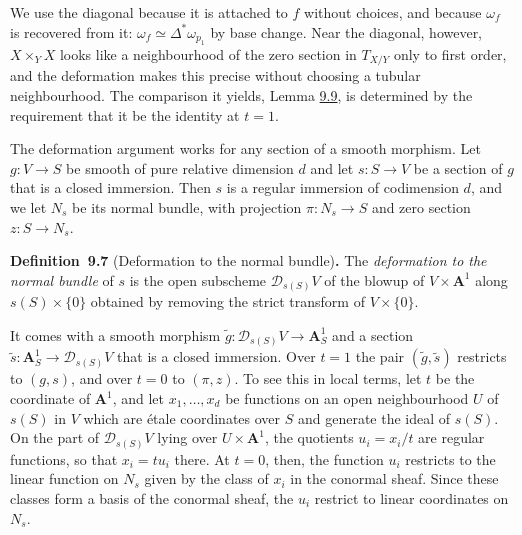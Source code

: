 \documentclass[11pt]{article}
\newenvironment{bpstatement}[2]{\par\addvspace{0.6\baselineskip}\noindent\textbf{#1}#2\textbf{.}\enspace\ignorespaces}
  {\par\addvspace{0.4\baselineskip}}
\begin{document}
We use the diagonal because it is attached to \(f\) without choices, and because \(\omega_f\) is recovered from it: \(\omega_f\simeq\Delta^*\omega_{p_1}\) by base change. Near the diagonal, however, \(X\times_YX\) looks like a neighbourhood of the zero section in \(T_{X/Y}\) only to first order, and the deformation makes this precise without choosing a tubular neighbourhood. The comparison it yields, Lemma \hyperref[bp27]{9.9}, is determined by the requirement that it be the identity at \(t=1\).

The deformation argument works for any section of a smooth morphism. Let \(g:V\to S\) be smooth of pure relative dimension \(d\) and let \(s:S\to V\) be a section of \(g\) that is a closed immersion. Then \(s\) is a regular immersion of codimension \(d\), and we let \(N_s\) be its normal bundle, with projection \(\pi:N_s\to S\) and zero section \(z:S\to N_s\).

\label{bp24}%
\begin{bpstatement}{Definition~9.7}{ (Deformation to the normal bundle)}
The \emph{deformation to the normal bundle} of \(s\) is the open subscheme \(\mathcal D_{s(S)}V\) of the blowup of \(V\times\mathbf A^1\) along \(s(S)\times\{0\}\) obtained by removing the strict transform of \(V\times\{0\}\).
\end{bpstatement}

\label{bp25}%
It comes with a smooth morphism \(\widetilde g:\mathcal D_{s(S)}V\to\mathbf A^1_S\) and a section \(\widetilde s:\mathbf A^1_S\to\mathcal D_{s(S)}V\) that is a closed immersion. Over \(t=1\) the pair \((\widetilde g,\widetilde s)\) restricts to \((g,s)\), and over \(t=0\) to \((\pi,z)\). To see this in local terms, let \(t\) be the coordinate of \(\mathbf A^1\), and let \(x_1,\ldots,x_d\) be functions on an open neighbourhood \(U\) of \(s(S)\) in \(V\) which are étale coordinates over \(S\) and generate the ideal of \(s(S)\). On the part of \(\mathcal D_{s(S)}V\) lying over \(U\times\mathbf A^1\), the quotients \(u_i=x_i/t\) are regular functions, so that \(x_i=tu_i\) there. At \(t=0\), then, the function \(u_i\) restricts to the linear function on \(N_s\) given by the class of \(x_i\) in the conormal sheaf. Since these classes form a basis of the conormal sheaf, the \(u_i\) restrict to linear coordinates on \(N_s\).
\end{document}
